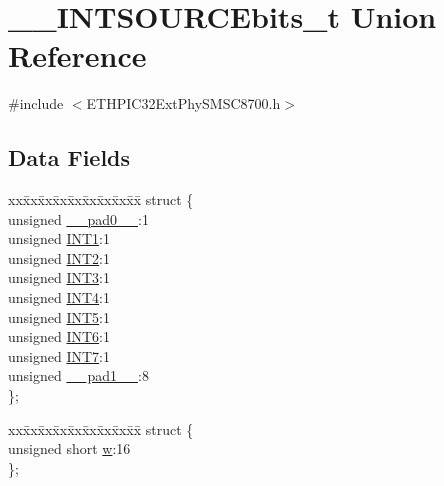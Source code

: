 \hypertarget{union_____i_n_t_s_o_u_r_c_ebits__t}{}\section{\+\_\+\+\_\+\+I\+N\+T\+S\+O\+U\+R\+C\+Ebits\+\_\+t Union Reference}
\label{union_____i_n_t_s_o_u_r_c_ebits__t}


{\ttfamily \#include $<$E\+T\+H\+P\+I\+C32\+Ext\+Phy\+S\+M\+S\+C8700.\+h$>$}

\subsection*{Data Fields}
\begin{DoxyCompactItemize}
\item 
\begin{tabbing}
xx\=xx\=xx\=xx\=xx\=xx\=xx\=xx\=xx\=\kill
struct \{\\
\>unsigned \hyperlink{union_____i_n_t_s_o_u_r_c_ebits__t_adf71f3d8410c1f1dbbc96680a92c49af}{\_\_pad0\_\_}:1\\
\>unsigned \hyperlink{union_____i_n_t_s_o_u_r_c_ebits__t_a47cc5a5beb081340f905482dc80e00d3}{INT1}:1\\
\>unsigned \hyperlink{union_____i_n_t_s_o_u_r_c_ebits__t_a701a787be03bde234890290d2a507f1d}{INT2}:1\\
\>unsigned \hyperlink{union_____i_n_t_s_o_u_r_c_ebits__t_a6c886eb45c0096c0d3bc37b05416b171}{INT3}:1\\
\>unsigned \hyperlink{union_____i_n_t_s_o_u_r_c_ebits__t_af8c7aac64c1dded6d4bab1e8d958bc19}{INT4}:1\\
\>unsigned \hyperlink{union_____i_n_t_s_o_u_r_c_ebits__t_a832ae44f354c9afd727f5ace181e439f}{INT5}:1\\
\>unsigned \hyperlink{union_____i_n_t_s_o_u_r_c_ebits__t_a32ed04340c8ad7c9e9615760fe9c56e9}{INT6}:1\\
\>unsigned \hyperlink{union_____i_n_t_s_o_u_r_c_ebits__t_ace3cce0f8bc2d246805ad9a8c00ea02e}{INT7}:1\\
\>unsigned \hyperlink{union_____i_n_t_s_o_u_r_c_ebits__t_acaf2d0924a107ec6e8d2e31febaf66f9}{\_\_pad1\_\_}:8\\
\}; \\

\end{tabbing}\item 
\begin{tabbing}
xx\=xx\=xx\=xx\=xx\=xx\=xx\=xx\=xx\=\kill
struct \{\\
\>unsigned short \hyperlink{union_____i_n_t_s_o_u_r_c_ebits__t_a160850a4684a3e82c2323033964f2e98}{w}:16\\
\}; \\


\end{tabbing}
\end{DoxyCompactItemize}
